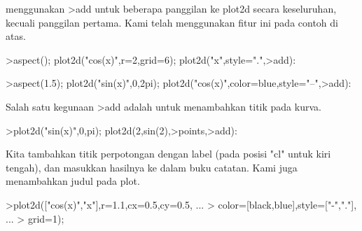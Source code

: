 \documentclass[a4paper,10pt]{article}
\begin{document}
\begin{eulernotebook}
\begin{eulercomment}
\begin{eulercomment}
\begin{eulercomment}
\begin{eulercomment}
\begin{eulercomment}
\begin{eulercomment}
\begin{eulercomment}
\begin{eulercomment}
\begin{eulercomment}
\begin{eulercomment}
\begin{eulercomment}
\begin{eulercomment}
\begin{eulercomment}
\begin{eulercomment}
\begin{eulercomment}
\begin{eulercomment}
\begin{eulercomment}
\begin{eulercomment}
\begin{eulercomment}
\begin{eulercomment}
\begin{eulercomment}
\begin{eulercomment}
\begin{eulercomment}
\begin{eulercomment}
\begin{eulercomment}
\begin{eulercomment}
\begin{eulercomment}
\begin{eulercomment}
\begin{eulercomment}
\begin{eulercomment}
\begin{eulercomment}
\begin{eulercomment}
\begin{eulercomment}
\begin{eulercomment}
\begin{eulercomment}
\begin{eulercomment}
\begin{eulercomment}
menggunakan \textgreater{}add untuk beberapa panggilan ke plot2d secara
keseluruhan, kecuali panggilan pertama. Kami telah menggunakan fitur
ini pada contoh di atas.
\end{eulercomment}
\begin{eulerprompt}
>aspect(); plot2d("cos(x)",r=2,grid=6); plot2d("x",style=".",>add):
\end{eulerprompt}
\begin{eulerprompt}
>aspect(1.5); plot2d("sin(x)",0,2pi); plot2d("cos(x)",color=blue,style="--",>add):
\end{eulerprompt}
\begin{eulercomment}
Salah satu kegunaan \textgreater{}add adalah untuk menambahkan titik pada kurva.
\end{eulercomment}
\begin{eulerprompt}
>plot2d("sin(x)",0,pi); plot2d(2,sin(2),>points,>add):
\end{eulerprompt}
\begin{eulercomment}
Kita tambahkan titik perpotongan dengan label (pada posisi "cl" untuk
kiri tengah), dan masukkan hasilnya ke dalam buku catatan. Kami juga
menambahkan judul pada plot.
\end{eulercomment}
\begin{eulerprompt}
>plot2d(["cos(x)","x"],r=1.1,cx=0.5,cy=0.5, ...
> color=[black,blue],style=["-","."], ...
> grid=1);
\end{eulerprompt}
\begin{euleroutput}

\end{euleroutput}
\end{eulercomment}
\end{eulercomment}
\end{eulercomment}
\end{eulercomment}
\end{eulercomment}
\end{eulercomment}
\end{eulercomment}
\end{eulercomment}
\end{eulercomment}
\end{eulercomment}
\end{eulercomment}
\end{eulercomment}
\end{eulercomment}
\end{eulercomment}
\end{eulercomment}
\end{eulercomment}
\end{eulercomment}
\end{eulercomment}
\end{eulercomment}
\end{eulercomment}
\end{eulercomment}
\end{eulercomment}
\end{eulercomment}
\end{eulercomment}
\end{eulercomment}
\end{eulercomment}
\end{eulercomment}
\end{eulercomment}
\end{eulercomment}
\end{eulercomment}
\end{eulercomment}
\end{eulercomment}
\end{eulercomment}
\end{eulercomment}
\end{eulercomment}
\end{eulercomment}
\end{eulernotebook}
\end{document}
